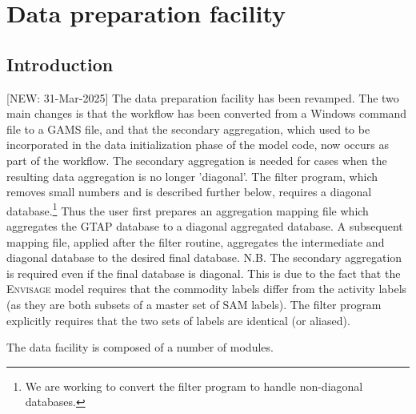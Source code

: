 \section{Data preparation facility}

\subsection{Introduction}

[NEW: 31-Mar-2025] The data preparation facility has been revamped. The two
main changes is that the workflow has been converted from a Windows command file
to a GAMS file, and that the secondary aggregation, which used to be incorporated
in the data initialization phase of the model code, now occurs as part of the workflow.
The secondary aggregation is needed for cases when the resulting data aggregation
is no longer 'diagonal'. The filter program, which removes small numbers and is
described further below, requires a diagonal database.\footnote{We are working
to convert the filter program to handle non-diagonal databases.} Thus the user
first prepares an aggregation mapping file which aggregates the GTAP database
to a diagonal aggregated database. A subsequent mapping file, applied after the
filter routine, aggregates the intermediate and diagonal database to the
desired final database. N.B. The secondary aggregation is required even if
the final database is diagonal. This is due to the fact that the \textsc{Envisage}
model requires that the commodity labels differ from the activity labels (as they
are both subsets of a master set of SAM labels). The filter program explicitly
requires that the two sets of labels are identical (or aliased).

The data facility is composed of a number of modules.

